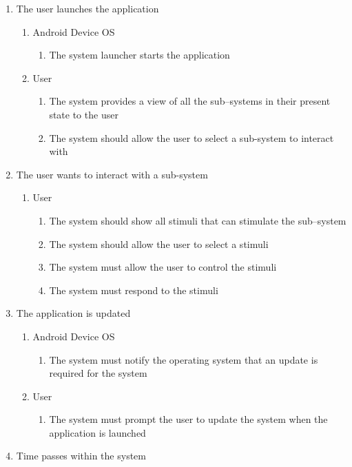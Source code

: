 \documentclass[]{article}
\begin{document}
\begin{enumerate}
	\item The user launches the application
	\begin{enumerate}
		\item Android Device OS
			\begin{enumerate}
				\item The system launcher starts the application
			\end{enumerate}
		\item User
			\begin{enumerate}
				\item The system provides a view of all the sub--systems in their present state to the user
				\item The system should allow the user to select a sub-system to interact with
			\end{enumerate}
	\end{enumerate}
	\item The user wants to interact with a sub-system
	\begin{enumerate}
		\item User
			\begin{enumerate}
				\item The system should show all stimuli that can stimulate the sub--system
				\item The system should allow the user to select a stimuli
				\item The system must allow the user to control the stimuli
				\item The system must respond to the stimuli
			\end{enumerate}
	\end{enumerate}
	\item The application is updated
	\begin{enumerate}
		\item Android Device OS
			\begin{enumerate}
				\item The system must notify the operating system that an update is required for the system
			\end{enumerate}
		\item User
			\begin{enumerate}
				\item The system must prompt the user to update the system when the application is launched
			\end{enumerate}
	\end{enumerate}
	\item Time passes within the system

\end{enumerate}
\end{document}
